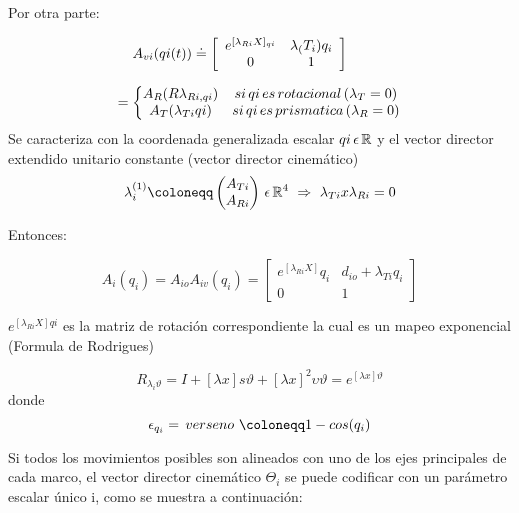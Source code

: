 \documentclass[journal]{IEEEtran}
\begin{document}
    Por otra parte:

    \begin{equation*}
        \hspace{-10mm}
        A_{vi} (qi(t)) \doteq \left[
            \begin{array}{cc}
                e^{[\lambda_{Ri}X]_{qi}} & \lambda_(T_i)q_i\\
                0 & 1\\
            \end{array}\right]  
    \end{equation*} 

    $$ = 
    \left\{\begin{matrix}
    A_R (R\lambda_{Ri,qi}) & si \thinspace qi \thinspace es \thinspace rotacional \thinspace(\lambda_T=0) \\ 
    A_T (\lambda_{Ti}qi) & si \thinspace qi \thinspace es \thinspace prismatica \thinspace(\lambda_R=0) \\ 
    \end{matrix}\right.
    $$
    Se caracteriza con la coordenada generalizada escalar $qi\thinspace \epsilon \thinspace \mathbb{R} $ y el
    vector director extendido unitario constante (vector director cinemático)
    $$\lambda_{i}^{(1)} \coloneqq   
    \begin{pmatrix} A_{Ti} \\ A_{Ri} \\ \end{pmatrix} \thinspace   \epsilon \thinspace \mathbb{R}^4 \thinspace
    \thinspace \Rightarrow \thinspace \thinspace \lambda_{Ti}x\lambda_{Ri}=0$$

    Entonces:

    $$A_{i}(q_{i})=A_{io}A_{iv}(q_{i})=\begin{bmatrix} e^{[\lambda_{Ri}X]}q_{i}& d_{io}+\lambda_{Ti}q_{i}\\ 0 & 1\end{bmatrix}$$

    $e^{[\lambda_{Ri}X]qi}$ es la matriz de rotación correspondiente la cual es un mapeo exponencial (Formula de Rodrigues)

    $$R_{\lambda_{i}\vartheta}=I+[\lambda x]s\vartheta+[\lambda x]^{2}\upsilon\vartheta=e^{[\lambda x]\vartheta}$$
    donde
    $$ \epsilon_{q_i} = \thinspace verseno  \thinspace\thinspace \coloneqq  1 - cos(q_{i})$$ 

    Si todos los movimientos posibles son alineados con uno de los ejes principales de cada marco, el vector director
    cinemático $\Theta_i$ se puede codificar con un parámetro escalar único i, como se muestra a continuación:
\end{document}
